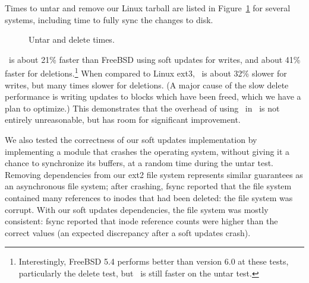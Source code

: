 \label{sec:eval:untardel}

Times to untar and remove our Linux tarball are listed in
Figure~\ref{fig:macro} for several systems, including time to fully sync
the changes to disk.

\begin{figure}[t]
\caption{\label{fig:macro} Untar and delete times.}
\end{figure}

\Kudos\ is about 21\% faster than FreeBSD using soft updates for
writes, and about 41\% faster for deletions.\footnote{Interestingly, FreeBSD 5.4
performs better than version 6.0 at these tests, particularly the delete test,
but \Kudos\ is still faster on the untar test.}
%
When compared to Linux ext3, \Kudos\ is about 32\% slower for writes, but many
times slower for deletions.
(A major cause of the slow delete performance is writing
updates to blocks which have been freed, which we have a plan to optimize.)
%
This demonstrates that the overhead of using \chdescs\ in \Kudos\ is not
entirely unreasonable, but has room for significant improvement.
%
%

We also tested the correctness of our soft updates implementation by
implementing a module that crashes the operating system, without giving it
a chance to synchronize its buffers, at a random time during the untar
test.
%
Removing dependencies from our ext2 file system represents similar
guarantees as an asynchronous file system; after crashing, fsync reported
that the file system contained many references to inodes that had been
deleted: the file system was corrupt.
%
With our soft updates dependencies, the file system was mostly consistent:
fsync reported that inode reference counts were higher than the correct
values (an expected discrepancy after a soft updates crash).


